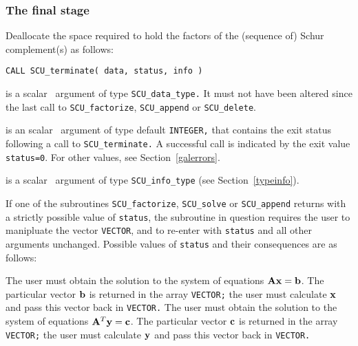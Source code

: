 \documentclass{galahad}
\newcommand{\packagename}{SCU}
\begin{document}

\subsubsection{The final stage}
Deallocate the space required to hold the factors of the 
(sequence of) Schur complement(s) as follows:
\vspace*{1mm}

\hskip0.5in 
{\tt CALL \packagename\_terminate( data, status, info )}

\vspace*{-2mm}
\begin{description}
 is a scalar \intentinout\ argument of type 
{\tt \packagename\_data\_type.} 
It must not have been altered since the last call to  
{\tt \packagename\_factorize}, 
{\tt \packagename\_append} or {\tt \packagename\_delete}. 
 
 is an scalar \intentout\ argument of type default 
{\tt INTEGER,} that  
contains the exit status following a call to {\tt \packagename\_terminate.} 
A successful call is indicated by the exit value {\tt status=0}. 
For other values, see Section~\ref{galerrors}. 
 
 is a scalar \intentout\ argument of type 
{\tt \packagename\_info\_type} 
(see Section~\ref{typeinfo}). 
 

\end{description}


\galreverse
If one of the subroutines 
{\tt \packagename\_factorize},  
{\tt \packagename\_solve} or  
{\tt \packagename\_append} 
returns with a strictly possible value of {\tt status},  
the subroutine in question requires the user to manipluate the vector  
{\tt VECTOR}, and to re-enter with {\tt status} and all other arguments 
unchanged. 
Possible values of {\tt status} and their consequences are as follows: 

\begin{description} 
 The user must obtain the solution to the system of equations 
$ {\mathbf{A}} {\mathbf{x}}  =  {\mathbf{b}}$. 
The particular vector ${\mathbf{b}}$ is returned in the array {\tt VECTOR;} 
the user must calculate ${\mathbf{x}}$ and pass this vector back in {\tt VECTOR.} 
 The user must obtain the solution to the system of equations 
$ {\mathbf{A}}^T {\mathbf{y}}  =  {\mathbf{c}}$. 
The particular vector ${\mathbf{c}}$ is returned in the array {\tt VECTOR;} 
the user must calculate ${\mathbf{y}}$ and pass this vector back in {\tt VECTOR.} 
\end{description} 
\end{document}
